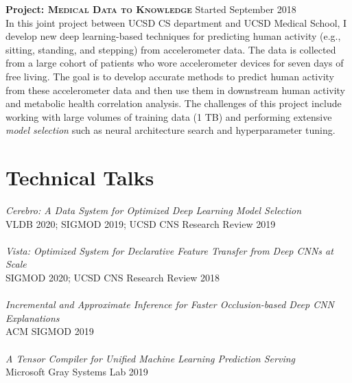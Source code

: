 \documentclass[margin]{res}
\begin{document}
\begin{resume}
\textbf{Project: \textsc{Medical Data to Knowledge}} \hfill Started September 2018\\
In this joint project between UCSD CS department and UCSD Medical School, I develop new deep learning-based techniques for predicting human activity (e.g., sitting, standing, and stepping) from accelerometer data. The data is collected from a large cohort of patients who wore accelerometer devices for seven days of free living. The goal is to develop accurate methods to predict human activity from these accelerometer data and then use them in downstream human activity and metabolic health correlation analysis. The challenges of this project include working with large volumes of training data (1 TB) and performing extensive \textit{model selection} such as neural architecture search and hyperparameter tuning.


\section{Technical Talks}
\textit{Cerebro: A Data System for Optimized Deep Learning Model Selection}\\ VLDB 2020; SIGMOD 2019; UCSD CNS Research Review 2019\\\\
\textit{Vista: Optimized System for Declarative Feature Transfer from Deep CNNs at Scale}\\ SIGMOD 2020; UCSD CNS Research Review 2018\\\\
\textit{Incremental and Approximate Inference for Faster Occlusion-based Deep CNN Explanations}\\ ACM SIGMOD 2019\\\\
\textit{A Tensor Compiler for Unified Machine Learning Prediction Serving}\\ Microsoft Gray Systems Lab 2019\\



\end{resume}
\end{document}
